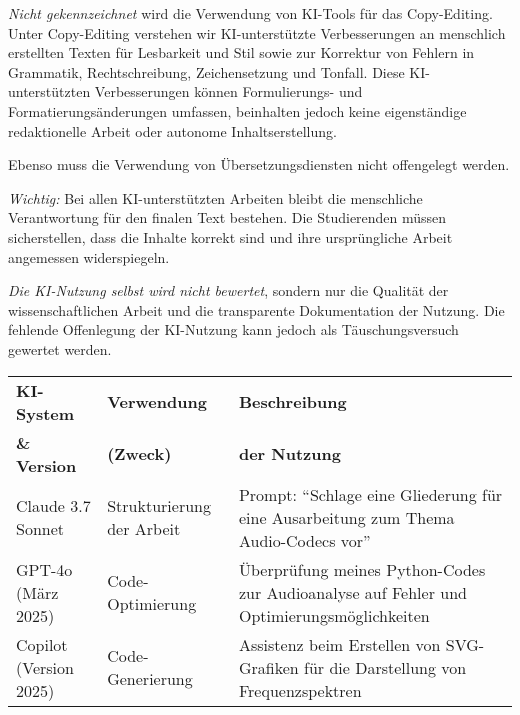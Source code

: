 \documentclass[12pt,        %
  english,ngerman,          %
  paper=a4,                 %
  captions=tablesignature,  %
  listof=numbered,          %
  bibliography=totoc,       %
  headings=small,           %
  headinclude=false,        %
  footinclude=false,        %
  parskip=half-,            %
  oneside,                  %
  DIV=12                    %
  ]{scrartcl}                %
\begin{document}
  
\textit{Nicht gekennzeichnet} wird die Verwendung von KI-Tools für das Copy-Editing. Unter Copy-Editing verstehen wir KI-unterstützte Verbesserungen an menschlich erstellten Texten für Lesbarkeit und Stil sowie zur Korrektur von Fehlern in Grammatik, Rechtschreibung, Zeichensetzung und Tonfall. Diese KI-unterstützten Verbesserungen können Formulierungs- und Formatierungsänderungen umfassen, beinhalten jedoch keine eigenständige redaktionelle Arbeit oder autonome Inhaltserstellung.

Ebenso muss die Verwendung von Übersetzungsdiensten nicht offengelegt werden.
  
\textit{Wichtig:} Bei allen KI-unterstützten Arbeiten bleibt die menschliche Verantwortung für den finalen Text bestehen. Die Studierenden müssen sicherstellen, dass die Inhalte korrekt sind und ihre ursprüngliche Arbeit angemessen widerspiegeln.
    
\textit{Die KI-Nutzung selbst wird nicht bewertet}, sondern nur die Qualität der wissenschaftlichen Arbeit und die transparente Dokumentation der Nutzung. Die fehlende Offenlegung der KI-Nutzung kann jedoch als Täuschungsversuch gewertet werden.


\nocite{cooper_ea-2014-about_face_4}





\bigskip\label{sec:ai_use}

  \begin{tabular}{
    >{\small\raggedright\arraybackslash}p{}
    >{\small\raggedright\arraybackslash}p{}
    >{\small\raggedright\arraybackslash}p{}
  }
  \textbf{KI-System}  & \textbf{Verwendung} & \textbf{Beschreibung} \\
  \textbf{\& Version} & \textbf{(Zweck)}    & \textbf{der Nutzung}  \\
  \hline
    Claude 3.7 Sonnet  & 
    Strukturierung der Arbeit & 
    Prompt: ``Schlage eine Gliederung für eine Ausarbeitung zum Thema Audio-Codecs vor'' \\
    GPT-4o (März 2025) &
    Code-Optimierung & 
    Überprüfung meines Python-Codes zur Audioanalyse auf Fehler und Optimierungsmöglichkeiten \\
    Copilot (Version 2025) &
    Code-Generierung &
    Assistenz beim Erstellen von SVG-Grafiken für die Darstellung von Frequenzspektren \\
\end{tabular}
\end{document}

